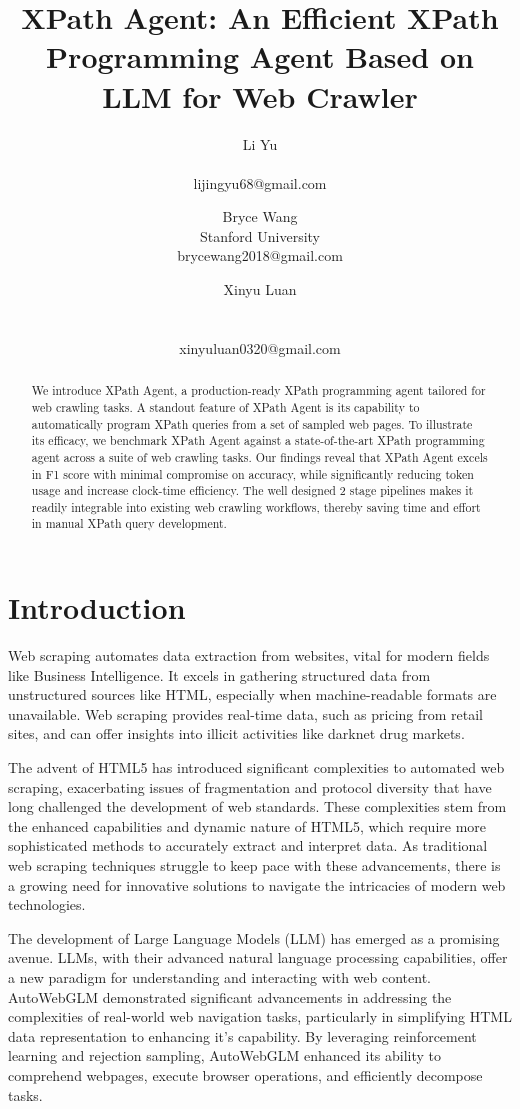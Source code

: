 \documentclass[a4paper]{article}
\title{XPath Agent: An Efficient XPath Programming Agent Based on LLM for Web Crawler}
\author{
Li Yu \\ \\ lijingyu68@gmail.com
\and
Bryce Wang \\ Stanford University  \\ brycewang2018@gmail.com
\and
Xinyu Luan \\ \\ \\ xinyuluan0320@gmail.com
}
\begin{document}
\maketitle

\begin{abstract}
We introduce XPath Agent, a production-ready XPath programming agent tailored for web crawling tasks. A standout feature of XPath Agent is its capability to automatically program XPath queries from a set of sampled web pages. To illustrate its efficacy, we benchmark XPath Agent against a state-of-the-art XPath programming agent across a suite of web crawling tasks. Our findings reveal that XPath Agent excels in F1 score with minimal compromise on accuracy, while significantly reducing token usage and increase clock-time efficiency. The well designed 2 stage pipelines makes it readily integrable into existing web crawling workflows, thereby saving time and effort in manual XPath query development.
\end{abstract}

\section{Introduction}

Web scraping \cite{khder2021web} automates data extraction from websites, vital for modern fields like Business Intelligence. It excels in gathering structured data from unstructured sources like HTML, especially when machine-readable formats are unavailable. Web scraping provides real-time data, such as pricing from retail sites, and can offer insights into illicit activities like darknet drug markets.

The advent of HTML5 \cite{TABARES2021101529} has introduced significant complexities to automated web scraping, exacerbating issues of fragmentation and protocol diversity that have long challenged the development of web standards. These complexities stem from the enhanced capabilities and dynamic nature of HTML5, which require more sophisticated methods to accurately extract and interpret data. As traditional web scraping techniques struggle to keep pace with these advancements, there is a growing need for innovative solutions to navigate the intricacies of modern web technologies.

The development of Large Language Models (LLM) has emerged as a promising avenue. LLMs, with their advanced natural language processing capabilities, offer a new paradigm for understanding and interacting with web content. AutoWebGLM\cite{lai2024autowebglmlargelanguagemodelbased} demonstrated significant advancements in addressing the complexities of real-world web navigation tasks, particularly in simplifying HTML data representation to enhancing it's capability. By leveraging reinforcement learning and rejection sampling, AutoWebGLM enhanced its ability to comprehend webpages, execute browser operations, and efficiently decompose tasks.
\end{document}
